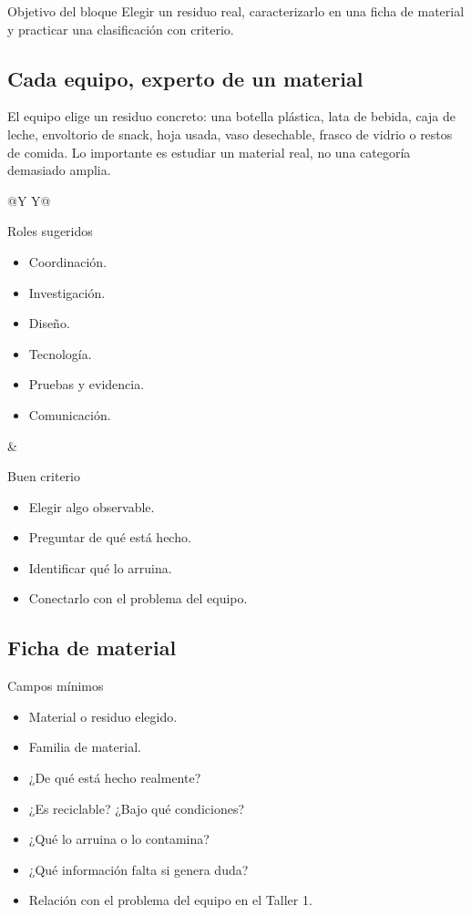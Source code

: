 \documentclass[10pt,a4paper]{article}
\begin{document}
\begin{infobox}{Objetivo del bloque}
Elegir un residuo real, caracterizarlo en una ficha de material y practicar una clasificación con criterio.
\end{infobox}

\subsection{Cada equipo, experto de un material}
El equipo elige un residuo concreto: una botella plástica, lata de bebida, caja de leche, envoltorio de snack, hoja usada, vaso desechable, frasco de vidrio o restos de comida. Lo importante es estudiar un material real, no una categoría demasiado amplia.

\begin{tabularx}{\textwidth}{@{}Y Y@{}}
\begin{infobox}[height=42mm]{Roles sugeridos}
\begin{itemize}
  \item Coordinación.
  \item Investigación.
  \item Diseño.
  \item Tecnología.
  \item Pruebas y evidencia.
  \item Comunicación.
\end{itemize}
\end{infobox}
&
\begin{infobox}[height=42mm]{Buen criterio}
\begin{itemize}
  \item Elegir algo observable.
  \item Preguntar de qué está hecho.
  \item Identificar qué lo arruina.
  \item Conectarlo con el problema del equipo.
\end{itemize}
\end{infobox}
\end{tabularx}

\subsection{Ficha de material}
\begin{keybox}{Campos mínimos}
\begin{itemize}
  \item Material o residuo elegido.
  \item Familia de material.
  \item ¿De qué está hecho realmente?
  \item ¿Es reciclable? ¿Bajo qué condiciones?
  \item ¿Qué lo arruina o lo contamina?
  \item ¿Qué información falta si genera duda?
  \item Relación con el problema del equipo en el Taller 1.
\end{itemize}
\end{keybox}
\end{document}
